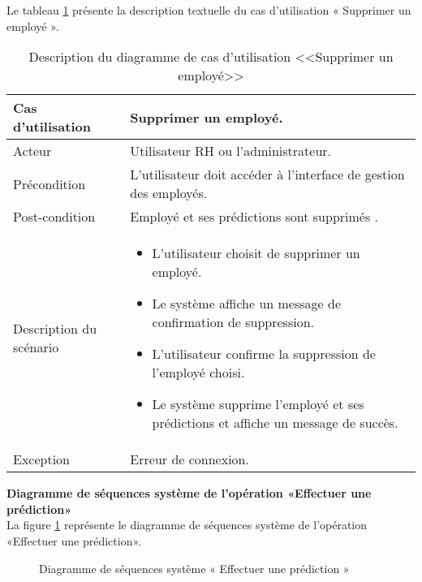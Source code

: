 Le tableau \ref{tab:Supprimeremployé} présente la description textuelle du cas d’utilisation « Supprimer un employé ».
\begin{longtable}[c]{
    |p{}
    |p{}|
}
    \caption{Description du diagramme de cas d’utilisation <<Supprimer un employé>>}
    \label{tab:Supprimeremployé}\\
    \hline
    
    Cas d’utilisation
    &  Supprimer un employé. \\
    \hline 
    
    Acteur
    & Utilisateur RH ou l'administrateur. \\
    \hline 
    
    Précondition
    & L'utilisateur doit accéder à l'interface de gestion des employés. \\
    \hline
    
    Post-condition
    & Employé et ses prédictions sont supprimés . \\
    \hline
    
    Description du
scénario

    &     \begin{itemize}
    \item L’utilisateur choisit de supprimer un employé.
    \item Le système affiche un message de confirmation de suppression.

   \item L'utilisateur confirme la suppression de l'employé choisi.
     \item Le système supprime l'employé et ses prédictions et affiche un message de succès.
    \end{itemize} \\
    \hline
    
   Exception
    & Erreur de connexion.
 \\ \hline
   
\end{longtable}
\newpage
\textbf{Diagramme de séquences système de l’opération «Effectuer une prédiction»}\\
La figure \ref{fig:seqsystemepredictionEmploye} représente le diagramme de séquences système de l’opération «Effectuer une prédiction».
\begin{figure}[htpb]
    \centering
    \caption{Diagramme de séquences système « Effectuer une prédiction »}
    \label{fig:seqsystemepredictionEmploye}
    \end{figure}
